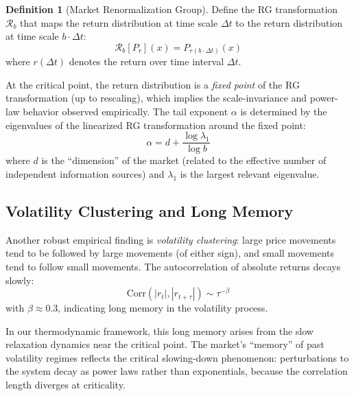 \documentclass[12pt,a4paper]{article}
\theoremstyle{definition}
\newtheorem{definition}[theorem]{Definition}
\begin{document}
\begin{definition}[Market Renormalization Group]\label{def:market_rg}
Define the RG transformation $\mathcal{R}_b$ that maps the return distribution at time scale $\Delta t$ to the return distribution at time scale $b \cdot \Delta t$:
\begin{equation}
    \mathcal{R}_b[P_r](x) = P_{r(b \cdot \Delta t)}(x)
\end{equation}
where $r(\Delta t)$ denotes the return over time interval $\Delta t$.
\end{definition}

At the critical point, the return distribution is a \emph{fixed point} of the RG transformation (up to rescaling), which implies the scale-invariance and power-law behavior observed empirically. The tail exponent $\alpha$ is determined by the eigenvalues of the linearized RG transformation around the fixed point:
\begin{equation}
    \alpha = d + \frac{\log \lambda_1}{\log b}
\end{equation}
where $d$ is the ``dimension'' of the market (related to the effective number of independent information sources) and $\lambda_1$ is the largest relevant eigenvalue.

\subsection{Volatility Clustering and Long Memory}

Another robust empirical finding is \emph{volatility clustering}: large price movements tend to be followed by large movements (of either sign), and small movements tend to follow small movements. The autocorrelation of absolute returns decays slowly:
\begin{equation}\label{eq:vol_clustering}
    \text{Corr}(|r_t|, |r_{t+\tau}|) \sim \tau^{-\beta}
\end{equation}
with $\beta \approx 0.3$, indicating long memory in the volatility process.

In our thermodynamic framework, this long memory arises from the slow relaxation dynamics near the critical point. The market's ``memory'' of past volatility regimes reflects the critical slowing-down phenomenon: perturbations to the system decay as power laws rather than exponentials, because the correlation length diverges at criticality.


\end{document}
